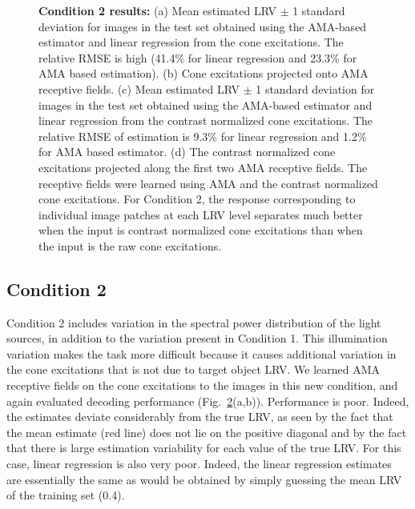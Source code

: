 \documentclass{jov}
\begin{document}
\begin{figure}
\begin{subfigure}[b]{0.22 \textwidth}
        \label{fig:case2RFResponseContrast}
    \end{subfigure}
    \caption{{\bf Condition 2 results:} (a) Mean estimated LRV $\pm$ 1 standard deviation for images in the test set obtained using the AMA-based estimator and linear regression from the cone excitations. The relative RMSE is high (41.4\% for linear regression and 23.3\% for AMA based estimation). (b) Cone excitations projected onto AMA receptive fields. (c) Mean estimated LRV $\pm$ 1 standard deviation for images in the test set obtained using the AMA-based estimator and linear regression from the contrast normalized cone excitations. The relative RMSE of estimation is 9.3\% for linear regression and 1.2\% for AMA based estimator. (d) The contrast normalized cone excitations projected along the first two AMA receptive fields. The receptive fields were learned using AMA and the contrast normalized cone excitations. For Condition 2, the response corresponding to individual image patches at each LRV level separates much better when the input is contrast normalized cone excitations than when the input is the raw cone excitations.}
\label{fig:Condition2}
\end{figure}

\subsection{Condition 2}

Condition 2 includes variation in the spectral power distribution of the light sources, in addition to the variation present in Condition 1. 
This illumination variation makes the task more difficult because it causes additional variation in the cone excitations that is not due to target object LRV. 
We learned AMA receptive fields on the cone excitations to the images in this new condition, and again evaluated decoding performance (Fig.~\ref{fig:Condition2}(a,b)). 
Performance is poor.
Indeed, the estimates deviate considerably from the true LRV, as seen by the fact that the mean estimate
(red line) does not lie on the positive diagonal and by the fact that there is large estimation variability for each
value of the true LRV.
For this case, linear regression is also very poor. Indeed, the linear regression estimates are essentially the same as would be obtained
by simply guessing the mean LRV of the training set (0.4).
\end{document}
